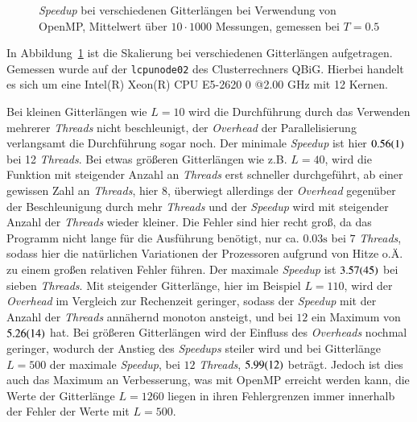 	\begin{figure}[htbp]
		
		\caption[\textit{Speedup} bei verschiedenen Gitterlängen bei Verwendung von OpenMP]{\textit{Speedup}  bei verschiedenen Gitterlängen bei Verwendung von OpenMP, Mittelwert über $10 \cdot 1000$ Messungen, gemessen bei $T=\num{0,5}$}
		\label{fig:skalierunglaenge}
	\end{figure}
	
	In Abbildung~\ref{fig:skalierunglaenge} ist die Skalierung bei verschiedenen Gitterlängen aufgetragen. Gemessen wurde auf der \texttt{lcpunode02} des Clusterrechners QBiG. Hierbei handelt es sich um eine Intel(R) Xeon(R) CPU E5-2620 0 @2.00 GHz mit 12 Kernen.%
	
	Bei kleinen Gitterlängen wie $L=10$ wird die Durchführung durch das Verwenden mehrerer \textit{Threads} nicht beschleunigt, der \textit{Overhead} der Parallelisierung verlangsamt die Durchführung sogar noch. Der minimale \textit{Speedup} ist hier $\num{0,56\pm0,01}$ bei 12 \textit{Threads}. Bei etwas größeren Gitterlängen wie z.{}B.{} $L=40$, wird die Funktion mit steigender Anzahl an \textit{Threads} erst schneller durchgeführt, ab einer gewissen Zahl an \textit{Threads}, hier $8$, überwiegt allerdings der \textit{Overhead} gegenüber der Beschleunigung durch mehr \textit{Threads} und der \textit{Speedup} wird mit steigender Anzahl der \textit{Threads} wieder kleiner. Die Fehler sind hier recht groß, da das Programm nicht lange für die Ausführung benötigt, nur ca.{} $\num{0,03}\si{\second}$ bei $7$ \textit{Threads}, sodass hier die natürlichen Variationen der Prozessoren aufgrund von Hitze o.{}Ä.{} zu einem großen relativen Fehler führen. Der maximale \textit{Speedup} ist $\num{3,57\pm0,45}$ bei sieben \textit{Threads}. Mit steigender Gitterlänge, hier im Beispiel $L=110$, wird der \textit{Overhead} im Vergleich zur Rechenzeit geringer, sodass der \textit{Speedup} mit der Anzahl der \textit{Threads} annähernd monoton ansteigt, und bei $12$ ein Maximum von $\num{5,26\pm0,14}$ hat.
	Bei größeren Gitterlängen wird der Einfluss des \textit{Overheads} nochmal geringer, wodurch der Anstieg des \textit{Speedups} steiler wird und bei Gitterlänge $L=500$ der maximale \textit{Speedup}, bei $12$ \textit{Threads}, $\num{5,99\pm0,12}$ beträgt. Jedoch ist dies auch das Maximum an Verbesserung, was mit OpenMP erreicht werden kann, die Werte der Gitterlänge $L=1260$ liegen in ihren Fehlergrenzen immer innerhalb der Fehler der Werte mit $L=500$.
 	
	
